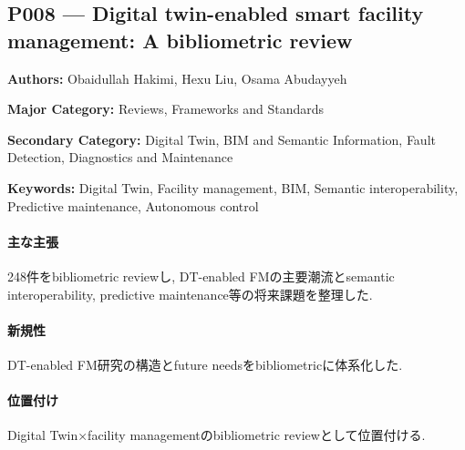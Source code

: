 \subsection{P008 --- Digital twin-enabled smart facility management: A bibliometric review}
\label{paper:P008}
\textbf{Authors:} Obaidullah Hakimi, Hexu Liu, Osama Abudayyeh\par
\textbf{Major Category:} Reviews, Frameworks and Standards\par
\textbf{Secondary Category:} Digital Twin, BIM and Semantic Information, Fault Detection, Diagnostics and Maintenance\par
\textbf{Keywords:} Digital Twin, Facility management, BIM, Semantic interoperability, Predictive maintenance, Autonomous control\par
\paragraph{主な主張}
248件をbibliometric reviewし, DT-enabled FMの主要潮流とsemantic interoperability, predictive maintenance等の将来課題を整理した. \cite{Hakimi:2024DTSmartFM}
\paragraph{新規性}
DT-enabled FM研究の構造とfuture needsをbibliometricに体系化した.
\paragraph{位置付け}
Digital Twin×facility managementのbibliometric reviewとして位置付ける.
